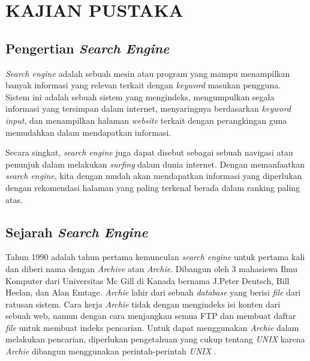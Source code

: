 
\chapter{KAJIAN PUSTAKA} 

\section{Pengertian \emph{Search Engine}}

\emph{Search engine} adalah sebuah mesin atau program yang mampu menampilkan banyak informasi yang relevan terkait dengan \textit{keyword} masukan pengguna. Sistem ini adalah sebuah sistem yang mengindeks, mengumpulkan segala informasi yang tersimpan dalam internet, menyaringnya berdasarkan \textit{keyword input}, dan menampilkan halaman \textit{website} terkait dengan perangkingan guna memudahkan dalam mendapatkan informasi.

Secara singkat, \textit{search engine} juga dapat disebut sebagai sebuah navigasi atau penunjuk dalam melakukan \textit{surfing} dalam dunia internet. Dengan memanfaatkan \textit{search engine}, kita dengan mudah akan mendapatkan informasi yang diperlukan dengan rekomendasi halaman yang paling terkenal berada dalam ranking paling atas.


\section{Sejarah \emph{Search Engine}}

Tahun 1990 adalah tahun pertama kemunculan \textit{search engine} untuk pertama kali dan diberi nama dengan \textit{Archive} atau \textit{Archie}. Dibangun oleh 3 mahasiswa Ilmu Komputer dari Universitas Mc Gill di Kanada bernama J.Peter Deutsch, Bill Heelan, dan Alan Emtage. \textit{Archie} lahir dari sebuah \textit{database} yang berisi \textit{file} dari ratusan sistem. Cara kerja \textit{Archie} tidak dengan mengindeks isi konten dari sebuah web, namun dengan cara menjangkau semua FTP dan membuat daftar \textit{file} untuk membuat indeks pencarian. Untuk dapat menggunakan \textit{Archie} dalam melakukan pencarian, diperlukan pengetahuan yang cukup tentang \textit{UNIX} karena \textit{Archie} dibangun menggunakan perintah-perintah \textit{UNIX} \citep{seymour2011history}.

